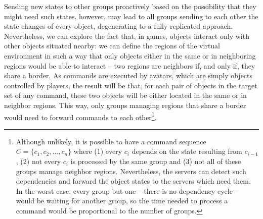 \documentclass[]{usiinfprospectus}
\begin{document}
Sending new states to other groups proactively based on the possibility that they might need such states, however, may lead to all groups sending to each other the state changes of every object, degenerating to a fully replicated approach. Nevertheless, we can explore the fact that, in games, objects interact only with other objects situated nearby: we can define the regions of the virtual environment in such a way that only objects either in the same or in neighboring regions would be able to interact -- two regions are neighbors if, and only if, they share a border. As commands are executed by avatars, which are simply objects controlled by players, the result will be that, for each pair of objects in the target set of any command, these two objects will be either located in the same or in neighbor regions. This way, only groups managing regions that share a border would need to forward commands to each other\footnote{Although unlikely, it is possible to have a command sequence $C = \{c_1,c_2,\ldots,c_n\}$ where (1) every $c_i$ depends on the state resulting from $c_{i-1}$, (2) not every $c_i$ is processed by the same group and (3) not all of these groups manage neighbor regions. Nevertheless, the servers can detect such dependencies and forward the object states to the servers which need them. In the worst case, every group but one -- there is no dependency cycle -- would be waiting for another group, so the time needed to process a command would be proportional to the number of groups.}.


% 
\end{document}
